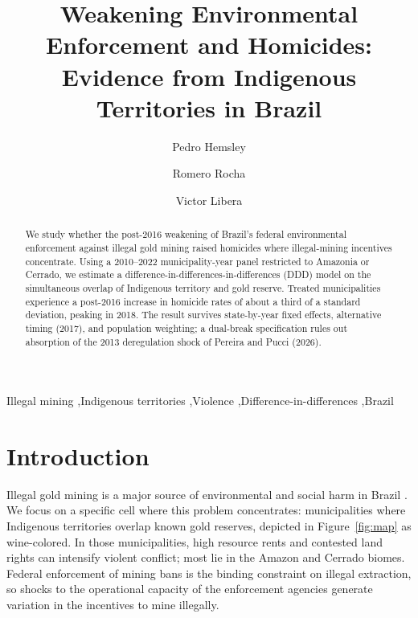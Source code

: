 \documentclass[preprint,12pt]{elsarticle}
\begin{document}
\begin{frontmatter}

\title{Weakening Environmental Enforcement and Homicides: Evidence from Indigenous Territories in Brazil}

\author[u1]{Pedro Hemsley}
\author[u1]{Romero Rocha}
\author[u2]{Victor Libera}
\address[u1]{Universidade Federal do Rio de Janeiro, Brazil}
\address[u2]{Banco Nacional de Desenvolvimento Economico e Social (BNDES), Brazil}

\begin{abstract}
We study whether the post-2016 weakening of Brazil's federal environmental enforcement against illegal gold mining raised homicides where illegal-mining incentives concentrate. Using a 2010–2022 municipality-year panel restricted to Amazonia or Cerrado, we estimate a difference-in-differences-in-differences (DDD) model on the simultaneous overlap of Indigenous territory and gold reserve. Treated municipalities experience a post-2016 increase in homicide rates of about a third of a standard deviation, peaking in 2018. The result survives state-by-year fixed effects, alternative timing (2017), and population weighting; a dual-break specification rules out absorption of the 2013 deregulation shock of Pereira and Pucci (2026).
\end{abstract}

\begin{keyword}
Illegal mining \sep Indigenous territories \sep Violence \sep Difference-in-differences \sep Brazil
\end{keyword}

\end{frontmatter}

\section{Introduction}
Illegal gold mining is a major source of environmental and social harm in Brazil \citep{pereira_pucci_2024}. We focus on a specific cell where this problem concentrates: municipalities where Indigenous territories overlap known gold reserves, depicted in Figure~\ref{fig:map} as wine-colored. In those municipalities, high resource rents and contested land rights can intensify violent conflict; most lie in the Amazon and Cerrado biomes. Federal enforcement of mining bans is the binding constraint on illegal extraction, so shocks to the operational capacity of the enforcement agencies generate variation in the incentives to mine illegally.
\end{document}
